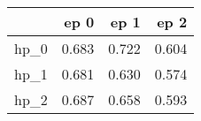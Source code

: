 \begin{tabular}{lrrr}
\toprule
{} &   ep 0 &   ep 1 &   ep 2 \\
\midrule
hp\_0 &  0.683 &  0.722 &  0.604 \\
hp\_1 &  0.681 &  0.630 &  0.574 \\
hp\_2 &  0.687 &  0.658 &  0.593 \\
\bottomrule
\end{tabular}
